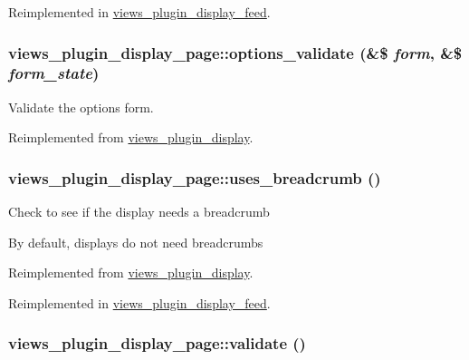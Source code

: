 Reimplemented in \hyperlink{classviews__plugin__display__feed_5c0b5faad36090985c85b16a454023a6}{views\_\-plugin\_\-display\_\-feed}.\hypertarget{classviews__plugin__display__page_192c8feb8740fdb389600fb7a8588c27}{
\subsubsection[{options\_\-validate}]{\setlength{\rightskip}{0pt plus 5cm}views\_\-plugin\_\-display\_\-page::options\_\-validate (\&\$ {\em form}, \/  \&\$ {\em form\_\-state})}}
\label{classviews__plugin__display__page_192c8feb8740fdb389600fb7a8588c27}


Validate the options form. 

Reimplemented from \hyperlink{classviews__plugin__display_0b4336df4db25dec552de8d20141a9f5}{views\_\-plugin\_\-display}.\hypertarget{classviews__plugin__display__page_cbdafb32168f809b28e083d654399f3f}{
\subsubsection[{uses\_\-breadcrumb}]{\setlength{\rightskip}{0pt plus 5cm}views\_\-plugin\_\-display\_\-page::uses\_\-breadcrumb ()}}
\label{classviews__plugin__display__page_cbdafb32168f809b28e083d654399f3f}


Check to see if the display needs a breadcrumb

By default, displays do not need breadcrumbs 

Reimplemented from \hyperlink{classviews__plugin__display_b3d2779948700bcc6c5ee3b26726f468}{views\_\-plugin\_\-display}.

Reimplemented in \hyperlink{classviews__plugin__display__feed_4bc729e21f5578c13d420bbaf3c388c5}{views\_\-plugin\_\-display\_\-feed}.\hypertarget{classviews__plugin__display__page_995cf48d67e20ef897d931fcbba391d1}{
\subsubsection[{validate}]{\setlength{\rightskip}{0pt plus 5cm}views\_\-plugin\_\-display\_\-page::validate ()}}
\label{classviews__plugin__display__page_995cf48d67e20ef897d931fcbba391d1}


